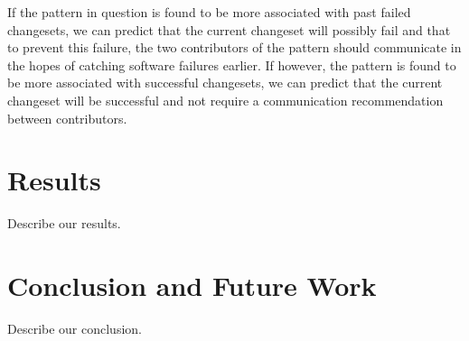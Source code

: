 \documentclass[conference]{IEEEtran}
\begin{document}
If the pattern in question is found to be more associated with past failed changesets, we can predict that
the current changeset will possibly fail and that to prevent this failure, the two contributors of the 
pattern should communicate in the hopes of catching software failures earlier. If however, the pattern
is found to be more associated with successful changesets, we can predict that the current changeset
will be successful and not require a communication recommendation between contributors.


\section{Results}
Describe our results.


\section{Conclusion and Future Work}
Describe our conclusion.







\end{document}
